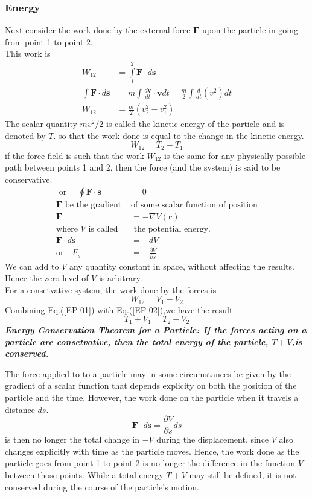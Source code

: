 \subsubsection{Energy}
Next consider the work done by the external force $\textbf{F}$ upon the particle in going from point 1 to point 2. \\
This work is 
\begin{align*}
W_{12}&=\int\limits_{1}^{2}\textbf{F}\cdot d\textbf{s}\\
\int\textbf{F}\cdot d\textbf{s}&=m\int\frac{d\textbf{v}}{dt}\cdot\textbf{v}dt=\frac{m}{2}\int\frac{d}{dt}(v^2)dt\\
W_{12}&=\frac{m}{2}(v_2^2-v_1^2)
\end{align*}
The scalar quantity $mv^2/2$ is called the kinetic energy of the particle and is denoted by $T$. so that the work done is equal to the change in the kinetic energy.
\begin{equation}
W_{12} =T_2-T_1\label{EP-01}
\end{equation}
if the force field is such that the work $W_{12}$ is the same for any physically possible path between points 1 and 2, then the force (and the system) is said to be conservative.
\begin{align*}
\text{ or }\quad
\oint\textbf{F}\cdot\textbf{s}&=0\\
\text{$\textbf{F}$ be the gradient }&\text{of some scalar function of position}\\
\textbf{F}&=-\nabla V(\textbf{r})\\
\text{where $V$ is called}&\text{ the potential energy.}\\
\textbf{F}\cdot d\textbf{s}&=-dV\\
\text{or}\quad
F_s&=-\frac{\partial V}{\partial s}
\end{align*}
We can add to $V$ any quantity constant in space, without affecting  the results. Hence the zero level of $V$ is arbitrary.\\
For a consetvative system, the work done by the forces is 
\begin{equation}
W_{12}=V_1-V_2\label{EP-02}
\end{equation}
Combining Eq.(\ref{EP-01}) with Eq.(\ref{EP-02}),we have the result 
$$T_1+V_1=T_2+V_2$$
\textbf{\textit{Energy Conservation Theorem for a Particle: If the forces acting on a particle are consetvative, then the total energy of the particle, $T+V$,is conserved.}}\\
\begin{note}
	The force applied to to a particle may in some circumstances be given by the gradient of a scalar function that depends explicity on both the position of the particle and the time. However, the work done on the particle when it travels a distance $ds$.
	$$\textbf{F}\cdot{d\textbf{s}=\frac{\partial V}{\partial s}ds}$$
	is then no longer the total change in $-V$ during the displacement, since $V$ also changes explicitly with time as the particle moves. Hence, the work done as the particle goes from point 1 to point 2 is no longer the difference in the function $V$ between those points. While a total  energy $T+V$ may still be defined, it is not conserved during the course of the particle's motion.
\end{note}
